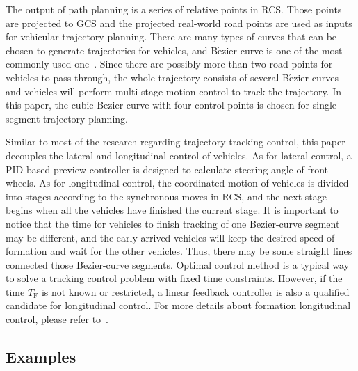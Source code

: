 \documentclass[journal]{IEEEtranTIE}
\begin{document}
The output of path planning is a series of relative points in RCS. Those points are projected to GCS and the projected real-world road points are used as inputs for vehicular trajectory planning. There are many types of curves that can be chosen to generate trajectories for vehicles, and B$\acute{\text{e}}$zier curve is one of the most commonly used one~\cite{gonzalez2015review}. Since there are possibly more than two road points for vehicles to pass through, the whole trajectory consists of several B$\acute{\text{e}}$zier curves and vehicles will perform multi-stage motion control to track the trajectory. In this paper, the cubic B$\acute{\text{e}}$zier curve with four control points is chosen for single-segment trajectory planning. 

Similar to most of the research regarding trajectory tracking control, this paper decouples the lateral and longitudinal control of vehicles. As for lateral control, a PID-based preview controller is designed to calculate steering angle of front wheels. As for longitudinal control, the coordinated motion of vehicles is divided into stages according to the synchronous moves in RCS, and the next stage begins when all the vehicles have finished the current stage. It is important to notice that the time for vehicles to finish tracking of one B$\acute{\text{e}}$zier-curve segment may be different, and the early arrived vehicles will keep the desired speed of formation and wait for the other vehicles. Thus, there may be some straight lines connected those B$\acute{\text{e}}$zier-curve segments. Optimal control method is a typical way to solve a tracking control problem with fixed time constraints. However, if the time $T_\text{F}$ is not known or restricted, a linear feedback controller is also a qualified candidate for longitudinal control. For more details about formation longitudinal control, please refer to~\cite{cai2021formationb}.




%
\subsection{Examples}
\label{examples}
%
\end{document}
